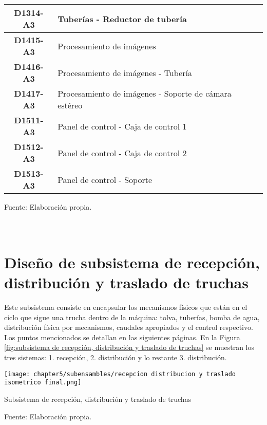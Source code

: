 \begin{mytable}[H]
\begin{tabular}{|c|l|}
		\textbf{D1314-A3}         & Tuberías - Reductor de tubería \\ \hline
		\textbf{D1415-A3}         & Procesamiento de imágenes \\ \hline
		\textbf{D1416-A3}         & Procesamiento de imágenes - Tubería \\ \hline
		\textbf{D1417-A3}         & Procesamiento de imágenes - Soporte de cámara estéreo \\ \hline
		\textbf{D1511-A3}         & Panel de control - Caja de control 1 \\ \hline
		\textbf{D1512-A3}         & Panel de control - Caja de control 2 \\ \hline
		\textbf{D1513-A3}         & Panel de control - Soporte \\ \hline
	\end{tabular}
	\begin{myflushcenteraftertable}	
		Fuente: Elaboración propia.
	\end{myflushcenteraftertable}
\end{mytable}




\pagestyle{myportland}
\doublespacing
\chapter[\quad\quad\quad\quad ----- Diseño de subsistema de recepción, distribución y traslado de truchas]{\\ Diseño de subsistema de recepción, distribución y traslado de truchas}
\thispagestyle{myportland}

\label{ssec:diseno de subsistema de recepcion, distribucion y traslado de truchas}

Este subsistema consiste en encapsular los mecanismos físicos que están en el ciclo que sigue una trucha dentro de la máquina: tolva, tuberías, bomba de agua, distribución física por mecanismos, caudales apropiados y el control respectivo. Los puntos mencionados se detallan en las siguientes páginas. En la Figura \ref{fig:subsistema de recepción, distribución y traslado de truchas} se muestran los tres sistemas: 1. recepción, 2. distribución y lo restante 3. distribución.

\begin{myfigure}[H]
	\footnotesize\centering
	\texttt{[image: chapter5/subensambles/recepcion distribucion y traslado isometrico final.png]}
	\caption{Subsistema de recepción, distribución y traslado de truchas}
	\begin{myflushcenter}
		Fuente: Elaboración propia.
	\end{myflushcenter}
	\label{fig:subsistema de recepción, distribución y traslado de truchas}
\end{myfigure}

